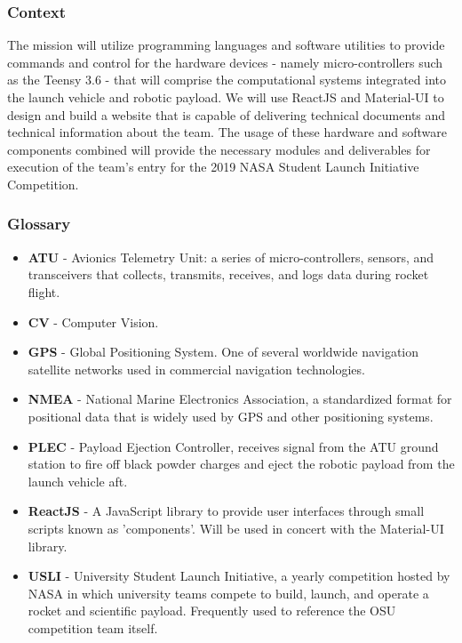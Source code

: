 \documentclass[onecolumn, draftclsnofoot, 10pt, compsoc]{IEEEtran}
\begin{document}
\subsubsection{Context}
The mission will utilize programming languages and software utilities to provide commands and control for the hardware devices - namely micro-controllers such as the Teensy 3.6 - that will comprise the computational systems integrated into the launch vehicle and robotic payload. We will use ReactJS and Material-UI to design and build a website that is capable of delivering technical documents and technical information about the team. The usage of these hardware and software components combined will provide the necessary modules and deliverables for execution of the team's entry for the 2019 NASA Student Launch Initiative Competition.  
\subsubsection{Glossary}
\begin{itemize}
    \item \textbf{ATU} - Avionics Telemetry Unit: a series of micro-controllers, sensors, and transceivers that collects, transmits, receives, and logs data during rocket flight.
    \item \textbf{CV} - Computer Vision.
    \item \textbf{GPS} - Global Positioning System. One of several worldwide navigation satellite networks used in commercial navigation technologies.
    \item \textbf{NMEA} - National Marine Electronics Association, a standardized format for positional data that is widely used by GPS and other positioning systems.
    \item \textbf{PLEC} - Payload Ejection Controller, receives signal from the ATU ground station to fire off black powder charges and eject the robotic payload from the launch vehicle aft.
    \item \textbf{ReactJS} - A JavaScript library to provide user interfaces through small scripts known as 'components'. Will be used in concert with the Material-UI library. 
    \item \textbf{USLI} - University Student Launch Initiative, a yearly competition hosted by NASA in which university teams compete to build, launch, and operate a rocket and scientific payload. Frequently used to reference the OSU competition team itself.
\end{itemize}
\end{document}
